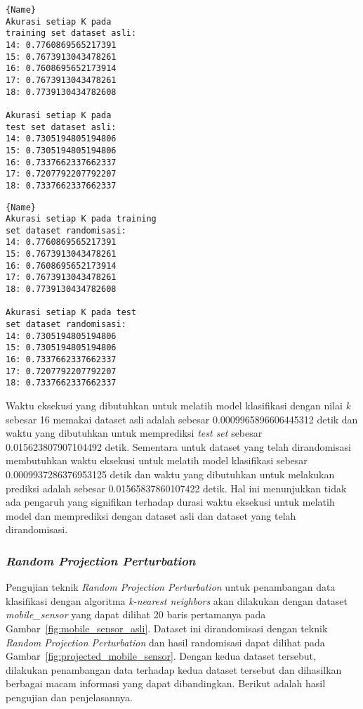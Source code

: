 \noindent\begin{minipage}{.44\textwidth}
	\begin{lstlisting}[caption=Akurasi Dataset Asli,frame=tlrb, label=diabetes_akurasi_asli]{Name}
Akurasi setiap K pada 
training set dataset asli:
14: 0.7760869565217391
15: 0.7673913043478261
16: 0.7608695652173914
17: 0.7673913043478261
18: 0.7739130434782608

Akurasi setiap K pada 
test set dataset asli: 
14: 0.7305194805194806
15: 0.7305194805194806
16: 0.7337662337662337
17: 0.7207792207792207
18: 0.7337662337662337
	\end{lstlisting}
\end{minipage}\hfill
\begin{minipage}{.46\textwidth}
	\begin{lstlisting}[caption=Akurasi Dataset Randomisasi,frame=tlrb, label=diabetes_akurasi_randomisasi]{Name}
Akurasi setiap K pada training 
set dataset randomisasi: 
14: 0.7760869565217391
15: 0.7673913043478261
16: 0.7608695652173914
17: 0.7673913043478261
18: 0.7739130434782608

Akurasi setiap K pada test 
set dataset randomisasi: 
14: 0.7305194805194806
15: 0.7305194805194806
16: 0.7337662337662337
17: 0.7207792207792207
18: 0.7337662337662337
	\end{lstlisting}
\end{minipage}
	
Waktu eksekusi yang dibutuhkan untuk melatih model klasifikasi dengan nilai \textit{k} sebesar 16 memakai dataset asli adalah sebesar 0.0009965896606445312 detik dan waktu yang dibutuhkan untuk memprediksi \textit{test set} sebesar 0.015623807907104492 detik. Sementara untuk dataset yang telah dirandomisasi membutuhkan waktu eksekusi untuk melatih model klasifikasi sebesar 0.0009937286376953125 detik dan waktu yang dibutuhkan untuk melakukan prediksi adalah sebesar 0.01565837860107422 detik. Hal ini menunjukkan tidak ada pengaruh yang signifikan terhadap durasi waktu eksekusi untuk melatih model dan memprediksi dengan dataset asli dan dataset yang telah dirandomisasi.

\subsubsection{\textit{Random Projection Perturbation}}
\label{subsubsec:pengujian-klasifikasi-rpp}

Pengujian teknik \textit{Random Projection Perturbation} untuk penambangan data klasifikasi dengan algoritma \textit{k-nearest neighbors} akan dilakukan dengan dataset \textit{mobile\_sensor} yang dapat dilihat 20 baris pertamanya pada Gambar~\ref{fig:mobile_sensor_asli}. Dataset ini dirandomisasi dengan teknik \textit{Random Projection Perturbation} dan hasil randomisasi dapat dilihat pada Gambar~\ref{fig:projected_mobile_sensor}. Dengan kedua dataset tersebut, dilakukan penambangan data terhadap kedua dataset tersebut dan dihasilkan berbagai macam informasi yang dapat dibandingkan. Berikut adalah hasil pengujian dan penjelasannya.

